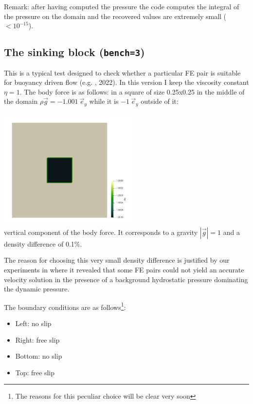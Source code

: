 Remark: after having computed the pressure the code computes the integral of the pressure 
on the domain and the recovered values are extremely small ($<10^{-15}$).  


\subsection*{The sinking block ({\tt bench=3})}

This is a typical test designed to check whether a particular 
FE pair is suitable for buoyancy driven flow (e.g. \textcite{thba22}, 2022).
In this version I keep the viscosity constant $\eta=1$.
The body force is as follows: in a square of size 0.25x0.25 in the middle of the domain
$\rho \vec{g}=-1.001~\vec{e}_y$ while it is $-1~\vec{e}_y$ outside of it:

\begin{center}
\includegraphics[width=7cm]{python_codes/fieldstone_161/results/bench3/by}\\
{\captionfont vertical component of the body force. 
It corresponds to a gravity $|\vec{g}|=1$
and a density difference of 0.1\%.}
\end{center}

The reason for choosing this very small density difference is justified by our 
experiments in \textcite{thba22} where it revealed that some FE pairs could not yield 
an accurate velocity solution in the presence of a background hydrostatic pressure
dominating the dynamic pressure. 

The boundary conditions are as follows\footnote{The reasons for this 
peculiar choice will be clear very soon}:
\begin{itemize}
\item Left: no slip
\item Right: free slip
\item Bottom: no slip
\item Top: free slip
\end{itemize}

